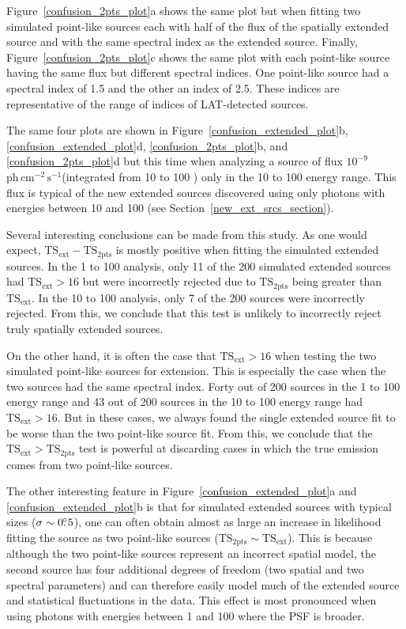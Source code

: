 \documentclass[12pt,preprint]{aastex}
\newcommand{\gev}{\text{GeV}\xspace}
\newcommand{\phflux}{\ensuremath{\text{ph}\,\text{cm}^{-2}\,\text{s}^{-1}}\xspace}
\newcommand{\tsext}{{\ensuremath{\text{TS}_{\text{ext}}}}\xspace}
\newcommand{\tsinc}{\ensuremath{\text{TS}_{\text{2pts}}}\xspace}
\begin{document}
Figure~\ref{confusion_2pts_plot}a shows the same plot but when fitting
two simulated point-like sources each with half of the flux of
the spatially extended source and with the same spectral index as the
extended source.  Finally, Figure~\ref{confusion_2pts_plot}c shows the same
plot with each point-like source having the same flux but different
spectral indices.  One point-like source had a spectral index of 1.5
and the other an index of 2.5.
These indices are representative of the range of indices of LAT-detected
sources.

The same four plots are shown in Figure~\ref{confusion_extended_plot}b, \ref{confusion_extended_plot}d, 
\ref{confusion_2pts_plot}b, and \ref{confusion_2pts_plot}d but this
time when analyzing a source of flux $10^{-9}$ \phflux (integrated from
10 \gev to 100 \gev) only in the 10 \gev to 100 \gev energy range.
This flux is typical of the new extended sources discovered
using only photons with energies between 10 \gev and 100 \gev (see
Section~\ref{new_ext_srcs_section}).

Several interesting conclusions can be made from this study.  As one would
expect, $\tsext-\tsinc$ is mostly positive when fitting the simulated
extended sources.  In the 1 \gev to 100 \gev analysis, only 11 of the
200 simulated extended sources had $\tsext>16$ but were incorrectly
rejected due to \tsinc being greater than \tsext.  In the 10 \gev to 100 \gev
analysis, only 7 of the 200 sources were incorrectly rejected. From this,
we conclude that this test is unlikely to incorrectly reject truly
spatially extended sources.

On the other hand, 
it is often
the case that $\tsext>16$ when testing the 
two simulated point-like sources
for extension.  This is especially the case
when the two sources had the same spectral index. Forty out of 200 sources
in the 1 \gev to 100 \gev energy range and 43 out of 200 sources in the
10 \gev to 100 \gev energy range had $\tsext>16$.  But in these cases,
we always found the single extended source fit to be worse than
the two point-like source fit.  From this, we conclude that the $\tsext>\tsinc$
test is powerful at discarding cases in which the true emission comes
from two point-like sources.


The other interesting feature in Figure~\ref{confusion_extended_plot}a
and \ref{confusion_extended_plot}b is that for simulated extended
sources with typical sizes ($\sigma\sim0\mbox{$.\!\!^\circ$}5$), one can often obtain
almost as large an increase in likelihood fitting the source as two
point-like sources ($\tsinc\sim\tsext$).  This is because although the
two point-like sources represent an incorrect spatial model, the second
source has four additional degrees of freedom (two spatial and two
spectral parameters) and can therefore easily model much of the extended
source and statistical fluctuations in the data.  This effect is most
pronounced when using photons with energies between 1 \gev and 100 \gev
where the PSF is broader.
\end{document}
